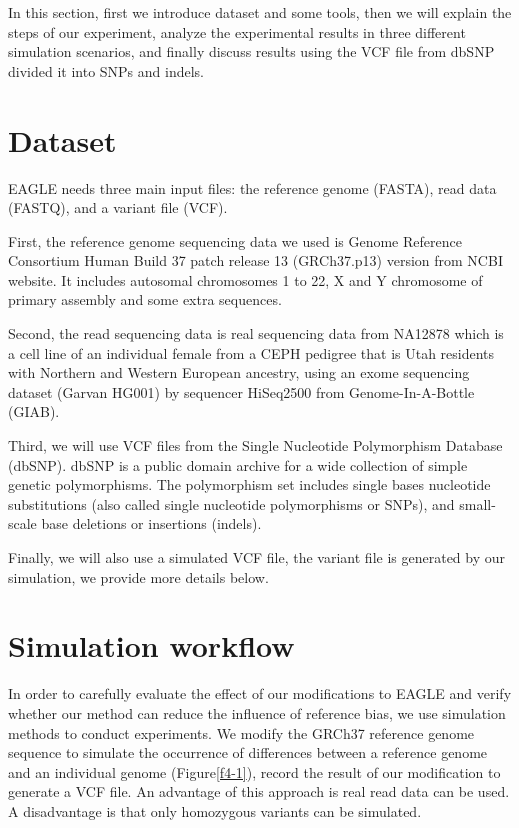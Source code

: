 \hspace{24pt}
In this section, first we introduce dataset and some tools, then we will explain the steps of our experiment, analyze the experimental results in three different simulation scenarios, and finally discuss results using the VCF file from dbSNP divided it into SNPs and indels.

\section{Dataset}
EAGLE needs three main input files: the reference genome (FASTA), read data (FASTQ), and a variant file (VCF). 

First, the reference genome sequencing data we used is Genome Reference Consortium Human Build 37 patch release 13 (GRCh37.p13) version from NCBI website.  It includes autosomal chromosomes 1 to 22, X and Y chromosome of primary assembly and some extra sequences.

Second, the read sequencing data is real sequencing data from NA12878 which is a cell line of an individual female from a CEPH pedigree that is Utah residents with Northern and Western European ancestry, using an exome sequencing dataset (Garvan HG001) by sequencer HiSeq2500 from Genome-In-A-Bottle (GIAB).

Third, we will use VCF files from the Single Nucleotide Polymorphism Database (dbSNP). dbSNP is a public domain archive for a wide collection of simple genetic polymorphisms. The polymorphism set includes single bases nucleotide substitutions (also called single nucleotide polymorphisms or SNPs), and small-scale base deletions or insertions (indels).

Finally, we will also use a simulated VCF file, the variant file is generated by our simulation, we provide more details below.

\section{Simulation workflow}
In order to carefully evaluate the effect of our modifications to EAGLE and verify whether our method can reduce the influence of reference bias, we use simulation methods to conduct experiments. We modify the GRCh37 reference genome sequence to simulate the occurrence of differences between a reference genome and an individual genome (Figure\ref{f4-1}), record the result of our modification to generate a VCF file.  An advantage of this approach is real read data can be used.  A disadvantage is that only homozygous variants can be simulated.

